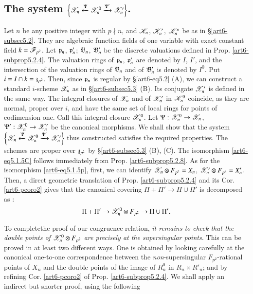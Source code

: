 \subsection{The system $\left\{\mathscr{X}_n \xleftarrow{\Psi} \mathscr{X}^0_n \xrightarrow{\Psi'} \mathscr{X}'_n \right\}$.}\label{art6-subsec5.4}
Let $n$ be any positive integer with $p \nmid n$, and $\mathscr{K}_n$, $\mathscr{K}'_n$, $\mathscr{K}^o_n$ be as in \S \ref{art6-subsec5.2}. They are algebraic function fields of one variable with exact constant field $k = \mathscr{F}_{p^2}$. Let $\mathfrak{p}_n$, $\mathfrak{p}'_n$; $\mathfrak{B}_n$, $\mathfrak{B}'_n$ be the discrete valuations defined in Prop. \ref{art6-subprop5.2.4}. The valuation rings of $\mathfrak{p}_n$, $\mathfrak{p}'_n$ are denoted by $I$, $I'$, and the intersection of the valuation rings of $\mathfrak{B}_n$ and of $\mathfrak{B}'_n$ is denoted by $I^0$. Put $i = I \cap k = \mathfrak{z}_{p^2}$. Then, since $\mathfrak{p}_n$ is regular by \S \ref{art6-eq5.2} (A), we can construct a standard $i$-scheme $\mathscr{X}_n$ as in \S \ref{art6-subsec5.3} (B). Its conjugate $\mathscr{X}'_n$ is defined in the same way. The integral closures of $\mathscr{X}_n$ and of $\mathscr{X}'_n$ in $\mathscr{K}^0_n$ coincide, as they are normal, proper over $i$, and have the same set of local rings for points of codimension one. Call this integral closure $\mathscr{X}^0_n$. Let $\Psi : \mathscr{X}^0_n \to \mathscr{X}_n$, $\Psi' : \mathscr{X}^0_n \to \mathscr{X}'_n$ be the canonical morphisms. We shall show that the system $\left\{\mathscr{X}_n \xleftarrow{\Psi} \mathscr{X}^0_n \xrightarrow{\Psi'} \mathscr{X}'_n \right\}$ thus constructed satisfies the required properties. The schemes are proper over $\mathfrak{z}_{p^2}$ by \S \ref{art6-subsec5.3} (B), (C). The isomorphism \eqref{art6-eq5.1.5C} follows immediately from Prop. \ref{art6-subprop5.2.8}. As for the isomorphism \eqref{art6-eq5.1.5p}, first, we can identify $\mathscr{X}_n \otimes F_{p^2} = X_n$, $\mathscr{X}'_n \otimes F_{p^2} = X'_n$. Then, a direct geometric translation of Prop. \ref{art6-subprop5.2.4} and its Cor. \ref{art6-pcoro2} gives that the canonical covering $\Pi + \Pi' \to \Pi \cup \Pi'$ is decomposed as :
\setcounter{equation}{0}
\begin{equation}
\Pi + \Pi ' \to \mathscr{X}^0_n \otimes F_{p^2} \to \Pi \cup \Pi'. \label{art6-eq5.4.1}
\end{equation}

To complete\pageoriginale the proof of our congruence relation, \textit{it remains to check that the double points of $\mathscr{X}^0_n \otimes F_{p^2}$ are precisely at the supersingular points.} This can be proved in at least two different ways. One is obtained by looking carefully at the canonical one-to-one correspondence between the \textit{non}-supersingular $F_{p^2}$-rational points of $X_n$ and the double points of the image of $R^0_n$ in $R_n \times R'_n$; and by refining Cor. \ref{art6-pcoro2} of Prop. \ref{art6-subprop5.2.4}. We shall apply an indirect but shorter proof, using the following

